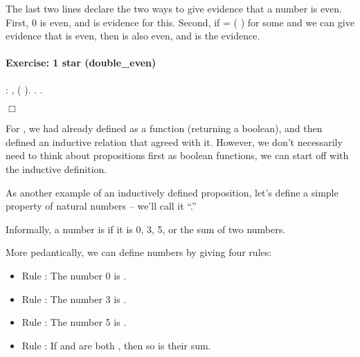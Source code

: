 \documentclass[12pt]{report}
\begin{document}
    The last two lines declare the two ways to give evidence that a
    number  is even.  First, 0 is even, and  is evidence
    for this.  Second, if  =  ( ) for some  and we can give
    evidence  that  is even, then  is also even, and  
     is the evidence.


\paragraph{Exercise: 1 star (double\_even)}

\begin{coqdoccode}
\coqdocemptyline
\coqdocnoindent
{}  : \coqdockw{\ensuremath{\forall}} ,\coqdoceol
\coqdocindent{1.00em}
 ( ).\coqdoceol
\coqdocnoindent
{}.\coqdoceol
 .\coqdoceol
\end{coqdoccode}
\ensuremath{\Box} \begin{coqdoccode}
\coqdocemptyline
\coqdocemptyline
\end{coqdoccode}
For , we had already defined  as a function (returning a
   boolean), and then defined an inductive relation that agreed with
   it. However, we don't necessarily need to think about propositions
   first as boolean functions, we can start off with the inductive
   definition.


 As another example of an inductively defined proposition, let's
    define a simple property of natural numbers -- we'll call it
    ``.'' 

 Informally, a number is  if it is 0, 3, 5, or the
    sum of two  numbers.  


    More pedantically, we can define  numbers by giving four
    rules:



\begin{itemize}
\item  Rule : The number 0 is .

\item  Rule : The number 3 is . 

\item  Rule : The number 5 is . 

\item  Rule : If  and  are both , then so is
         their sum. 
\end{itemize}
\end{document}
